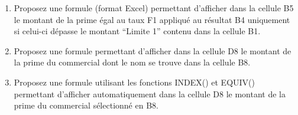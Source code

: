 \documentclass[a4paper]{article}
\newif\ifcorrection
\begin{document}
\begin{enumerate}
 \item Proposez une formule (format Excel) permettant d'afficher dans la cellule B5 le montant de la prime \'egal au taux F1 appliqu\'e au r\'esultat B4 
 uniquement si celui-ci d\'epasse le montant ``Limite 1'' contenu dans la cellule B1.
 \item Proposez une formule permettant d'afficher dans la cellule D8 le montant de la prime du commercial dont le nom se trouve dans la cellule B8.
 \item Proposez une formule utilisant les fonctions INDEX() et EQUIV() permettant d'afficher automatiquement dans la cellule D8 le montant de la prime du commercial s\'electionn\'e en B8.
\end{enumerate}
% 
% 
\end{document}
